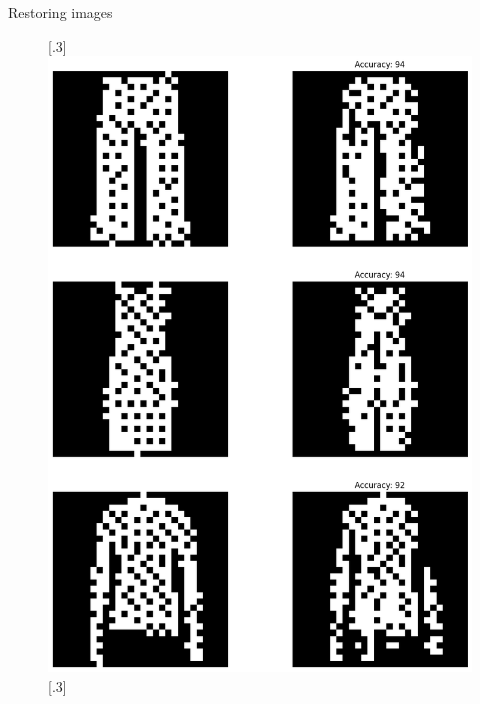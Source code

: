 \documentclass[25pt, a0paper, portrait]{beamer}
\newlength{\colwidth}
\begin{document}
\begin{frame}[t]
\begin{columns}[t]
\begin{column}{\colwidth}
\begin{block}{Restoring images}
    \begin{figure}[ht]
      [.3\linewidth]{%
        \includegraphics[width=\linewidth]{bwoutput}%
      }%
      \hfill
      [.3\linewidth]{%
}
\end{figure}
\end{block}
\end{column}
\end{columns}
\end{frame}
\end{document}
